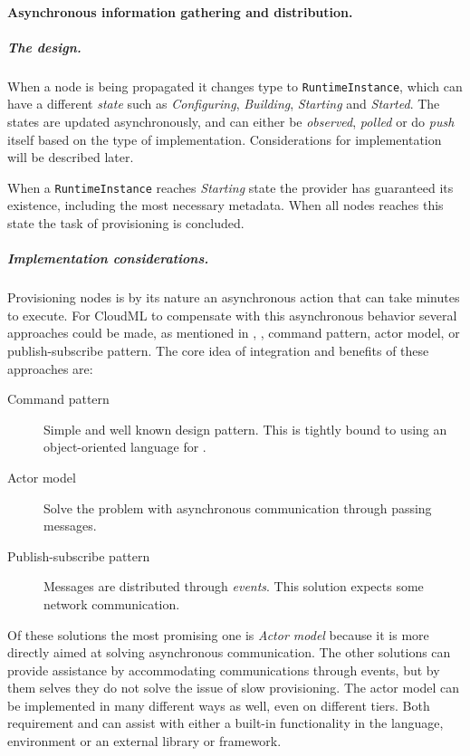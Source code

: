 \paragraph{Asynchronous information gathering and distribution.}

\subparagraph{The design.}

When a node is being propagated it changes type to \texttt{RuntimeInstance}, 
which can have a different \emph{state} such as 
\emph{Configuring}, \emph{Building}, \emph{Starting} and \emph{Started}.
The states are updated asynchronously, and can either be 
\emph{observed}, \emph{polled} or do \emph{push} itself based on the type of implementation.
Considerations for implementation will be described later.

When a \texttt{RuntimeInstance} reaches \emph{Starting} state the provider 
has guaranteed its existence, including the most necessary metadata.
When all nodes reaches this state the task of provisioning is concluded.

\subparagraph{Implementation considerations.}

Provisioning nodes is by its nature an asynchronous action that can take minutes to execute.
For CloudML to compensate with this asynchronous behavior several approaches could be made,
as mentioned in , \eg, command pattern, actor model,
or publish-subscribe pattern.
The core idea of integration and benefits of these approaches are:
\begin{description}
  \item[Command pattern] Simple and well known design pattern. 
    This is tightly bound to using an object-oriented language for .
  \item[Actor model] Solve the problem with asynchronous communication through passing messages.
  \item[Publish-subscribe pattern] Messages are distributed through \emph{events}.
    This solution expects some network communication.
\end{description}
Of these solutions the most promising one is \emph{Actor model} because it is more directly aimed
at solving asynchronous communication.
The other solutions can provide assistance by accommodating communications through events, 
but by them selves they do not solve the issue of slow provisioning.
The actor model can be implemented in many different ways as well, even on different tiers.
Both requirement  and  can assist with either
a built-in functionality in the language, environment or an external library or framework.

